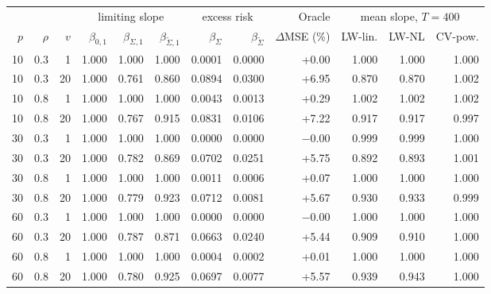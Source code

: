 \begin{tabular}{@{}rrr rrr rr r rrr@{}}
\toprule
 & & & \multicolumn{3}{c}{limiting slope} & \multicolumn{2}{c}{excess risk} & Oracle & \multicolumn{3}{c}{mean slope, $T=400$}\\
$p$ & $\rho$ & $v$ & $\beta_{0,1}$ & $\beta_{\Sigma,1}$ & $\beta_{\tilde\Sigma,1}$ & $\beta_{\Sigma}$ & $\beta_{\tilde\Sigma}$ & $\Delta$MSE (\%) & LW-lin. & LW-NL & CV-pow. \\
\midrule
10 & 0.3 & 1 & 1.000 & 1.000 & 1.000 & 0.0001 & 0.0000 & +0.00 & 1.000 & 1.000 & 1.000 \\
10 & 0.3 & 20 & 1.000 & 0.761 & 0.860 & 0.0894 & 0.0300 & +6.95 & 0.870 & 0.870 & 1.002 \\
10 & 0.8 & 1 & 1.000 & 1.000 & 1.000 & 0.0043 & 0.0013 & +0.29 & 1.002 & 1.002 & 1.002 \\
10 & 0.8 & 20 & 1.000 & 0.767 & 0.915 & 0.0831 & 0.0106 & +7.22 & 0.917 & 0.917 & 0.997 \\
30 & 0.3 & 1 & 1.000 & 1.000 & 1.000 & 0.0000 & 0.0000 & $-$0.00 & 0.999 & 0.999 & 1.000 \\
30 & 0.3 & 20 & 1.000 & 0.782 & 0.869 & 0.0702 & 0.0251 & +5.75 & 0.892 & 0.893 & 1.001 \\
30 & 0.8 & 1 & 1.000 & 1.000 & 1.000 & 0.0011 & 0.0006 & +0.07 & 1.000 & 1.000 & 1.000 \\
30 & 0.8 & 20 & 1.000 & 0.779 & 0.923 & 0.0712 & 0.0081 & +5.67 & 0.930 & 0.933 & 0.999 \\
60 & 0.3 & 1 & 1.000 & 1.000 & 1.000 & 0.0000 & 0.0000 & $-$0.00 & 1.000 & 1.000 & 1.000 \\
60 & 0.3 & 20 & 1.000 & 0.787 & 0.871 & 0.0663 & 0.0240 & +5.44 & 0.909 & 0.910 & 1.000 \\
60 & 0.8 & 1 & 1.000 & 1.000 & 1.000 & 0.0004 & 0.0002 & +0.01 & 1.000 & 1.000 & 1.000 \\
60 & 0.8 & 20 & 1.000 & 0.780 & 0.925 & 0.0697 & 0.0077 & +5.57 & 0.939 & 0.943 & 1.000 \\
\bottomrule
\end{tabular}